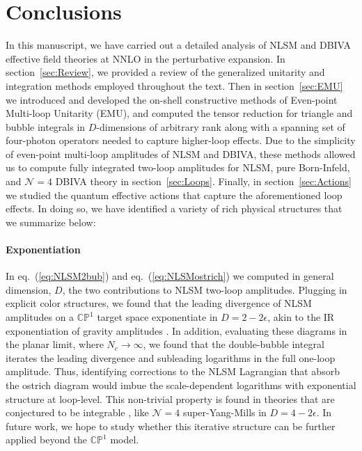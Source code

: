 \documentclass[11pt,letter]{article}
\def\sect#1{section~\ref{#1}}
\def\eqn#1{eq.~(\ref{#1})}
\begin{document}
\section{Conclusions}\label{sec:Discussion}
In this manuscript, we have carried out a detailed analysis of NLSM and DBIVA effective field theories at NNLO in the perturbative expansion. In \sect{sec:Review}, we provided a review of the generalized unitarity and integration methods employed throughout the text. Then in \sect{sec:EMU} we introduced and developed the on-shell constructive methods of Even-point Multi-loop Unitarity (EMU), and computed the tensor reduction for triangle and bubble integrals in $D$-dimensions of arbitrary rank along with a spanning set of four-photon operators needed to capture higher-loop effects. Due to the simplicity of even-point multi-loop amplitudes of NLSM and DBIVA, these methods allowed us to compute fully integrated two-loop amplitudes for NLSM, pure Born-Infeld, and $\mathcal{N}=4$ DBIVA theory in \sect{sec:Loops}. Finally, in \sect{sec:Actions} we studied the quantum effective actions that capture the aforementioned loop effects. In doing so, we have identified a variety of rich physical structures that we summarize below: 
\paragraph{\textbf{Exponentiation}} In \eqn{eq:NLSM2bub} and \eqn{eq:NLSMostrich} we computed in general dimension, $D$, the two contributions to NLSM two-loop amplitudes. Plugging in explicit color structures, we found that the leading divergence of NLSM amplitudes on a $\mathbb{CP}^1$ target space exponentiate in $D=2-2\epsilon$, akin to the IR exponentiation of gravity amplitudes \cite{Weinberg:1965nx,Naculich:2008ew,White:2011yy,DiVecchia:2019myk,DiVecchia:2019kta,Heissenberg:2021tzo}. In addition, evaluating these diagrams in the planar limit, where $N_c \rightarrow \infty$, we found that the double-bubble integral iterates the leading divergence and subleading logarithms in the full one-loop amplitude. Thus, identifying corrections to the NLSM Lagrangian that absorb the ostrich diagram would imbue the scale-dependent logarithms with exponential structure at loop-level. This non-trivial property is found in theories that are conjectured to be integrable \cite{Shankar:1977cm,Zamolodchikov:1977nu,Zamolodchikov:1978xm, Komatsu:2019hgc}, like $\mathcal{N}=4$ super-Yang-Mills \cite{Anastasiou:2003kj,Bern:2005iz} in $D=4-2\epsilon$. In future work, we hope to study whether this iterative structure can be further applied beyond the $\mathbb{CP}^1$ model. 
\end{document}
